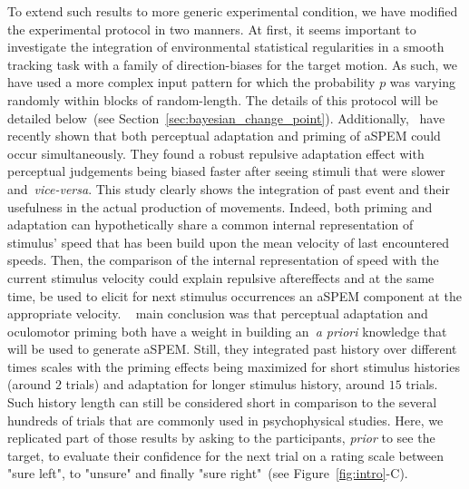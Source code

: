 \documentclass[profile,final,english, draft]{article}%
\newcommand{\citet}[1]{\textcite{#1}}
\newcommand{\seeFig}[1]{see Figure~\ref{fig:#1}}
\newcommand{\seeSec}[1]{see Section~\ref{sec:#1}}
\begin{document}
To extend such results to more generic experimental condition,
we have modified the experimental protocol in two manners.
At first, it seems important to investigate the integration of environmental statistical regularities
in a smooth tracking task with
a family of direction-biases for the target motion.
As such, we have used a more complex input pattern 
for which the probability $p$ was varying randomly
within blocks of random-length.
The details of this protocol will be detailed below~(\seeSec{bayesian_change_point}).
Additionally,~\citet{Maus2015} have recently shown that
both perceptual adaptation and priming of aSPEM could occur simultaneously.
They found a robust repulsive adaptation effect
with perceptual judgements being biased faster
after seeing stimuli that were slower and~\textit{vice-versa}.
This study clearly shows the integration of past event and
their usefulness in the actual production of movements.
Indeed, both priming and adaptation can hypothetically share
a common internal representation of stimulus' speed
that has been build upon the mean velocity of last encountered speeds.
Then, the comparison of the internal representation of speed
with the current stimulus velocity could explain repulsive aftereffects and
at the same time, be used to elicit for next stimulus occurrences
an aSPEM component at the appropriate velocity.
~\citet{Maus2015} main conclusion was that
perceptual adaptation and oculomotor priming
both have a weight in building an~\textit{a priori} knowledge
that will be used to generate aSPEM.
Still, they integrated past history over different times scales
with the priming effects being maximized
for short stimulus histories (around $2$ trials) and
adaptation for longer stimulus history, around $15$ trials.
Such history length can still be considered
short in comparison to the several hundreds 
of trials that are commonly used in psychophysical studies.
Here, we replicated part of those results
by asking to the participants,
\emph{prior} to see the target, 
to evaluate their confidence for the next trial on a rating scale 
between "sure left", to "unsure" and finally "sure right"~(\seeFig{intro}-C).
\end{document}
